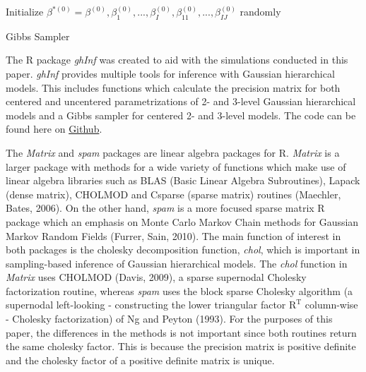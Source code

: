 \documentclass[]{article}
\begin{document}
\begin{algorithm}[H]
 Initialize $\beta^{* (0)} = \beta^{(0)}, \beta_1^{(0)}, ..., \beta_I^{(0)}, \beta_{11}^{(0)}, ..., \beta_{IJ}^{(0)}$ randomly\;
 \caption{Gibbs Sampler}
\end{algorithm}

\vspace{1.0cm} \newpage
{} \newline \newline \newline
{} \newline 

The R package \emph{ghInf} was created to aid with the simulations
conducted in this paper. \emph{ghInf} provides multiple tools for
inference with Gaussian hierarchical models. This includes functions
which calculate the precision matrix for both centered and uncentered
parametrizations of 2- and 3-level Gaussian hierarchical models and a
Gibbs sampler for centered 2- and 3-level models. The code can be found
here on \href{https://github.com/kwajiehao/ghInf}{Github}.
\newline \newline \newline

 \newline 

The \emph{Matrix} and \emph{spam} packages are linear algebra packages
for R. \emph{Matrix} is a larger package with methods for a wide variety
of functions which make use of linear algebra libraries such as BLAS
(Basic Linear Algebra Subroutines), Lapack (dense matrix), CHOLMOD and
Csparse (sparse matrix) routines (Maechler, Bates, 2006). On the other
hand, \emph{spam} is a more focused sparse matrix R package which an
emphasis on Monte Carlo Markov Chain methods for Gaussian Markov Random
Fields (Furrer, Sain, 2010). The main function of interest in both
packages is the cholesky decomposition function, \emph{chol}, which is
important in sampling-based inference of Gaussian hierarchical models.
The \emph{chol} function in \emph{Matrix} uses CHOLMOD (Davis, 2009), a
sparse supernodal Cholesky factorization routine, whereas \emph{spam}
uses the block sparse Cholesky algorithm (a supernodal left-looking -
constructing the lower triangular factor \(\text{R}^{\text{T}}\)
column-wise - Cholesky factorization) of Ng and Peyton (1993). For the
purposes of this paper, the differences in the methods is not important
since both routines return the same cholesky factor. This is because the
precision matrix is positive definite and the cholesky factor of a
positive definite matrix is unique.
\end{document}
